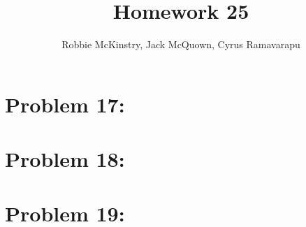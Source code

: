 \documentclass[12pt]{article}
\begin{document}
\title{Homework 25}
\author{Robbie McKinstry, Jack McQuown, Cyrus Ramavarapu}
\renewcommand{\today}{31 October 2016}
\renewcommand{\baselinestretch}{1.5}
\maketitle

\section*{Problem 17: }
\section*{Problem 18: }
\section*{Problem 19: }
\end{document}
